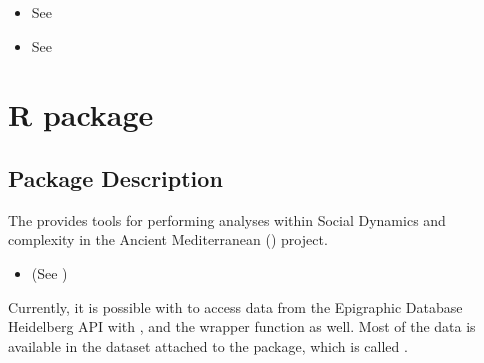 \documentclass[a4paper,12pt,english]{sphinxhowto}
\begin{document}

\begin{itemize}
\item {} 
See 

\item {} 
See 

\end{itemize}



\section{R package }
\label{\detokenize{sdam:r-package-sdam}}\label{\detokenize{sdam:sdam-pkg}}

\subsection{Package Description}
\label{\detokenize{sdam:package-description}}
The  provides tools for performing
analyses within Social Dynamics and complexity in the Ancient Mediterranean
() project.
\begin{itemize}
\item {} 
(See )

\end{itemize}


Currently, it is possible with  to access data from the Epigraphic Database Heidelberg API
with , and the wrapper function  as well. Most of the data is available
in the dataset attached to the package, which is called .
\end{document}
